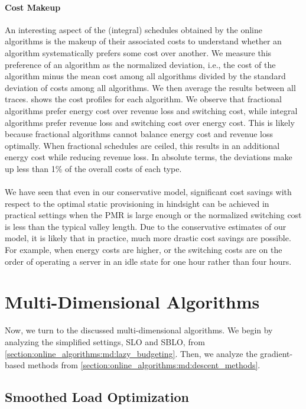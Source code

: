 \paragraph{Cost Makeup} An interesting aspect of the (integral) schedules obtained by the online algorithms is the makeup of their associated costs to understand whether an algorithm systematically prefers some cost over another. We measure this preference of an algorithm as the normalized deviation, i.e., the cost of the algorithm minus the mean cost among all algorithms divided by the standard deviation of costs among all algorithms. We then average the results between all traces.  shows the cost profiles for each algorithm. We observe that fractional algorithms prefer energy cost over revenue loss and switching cost, while integral algorithms prefer revenue loss and switching cost over energy cost. This is likely because fractional algorithms cannot balance energy cost and revenue loss optimally. When fractional schedules are ceiled, this results in an additional energy cost while reducing revenue loss. In absolute terms, the deviations make up less than 1\% of the overall costs of each type.

\paragraph{} We have seen that even in our conservative model, significant cost savings with respect to the optimal static provisioning in hindsight can be achieved in practical settings when the PMR is large enough or the normalized switching cost is less than the typical valley length. Due to the conservative estimates of our model, it is likely that in practice, much more drastic cost savings are possible. For example, when energy costs are higher, or the switching costs are on the order of operating a server in an idle state for one hour rather than four hours.

\section{Multi-Dimensional Algorithms}

Now, we turn to the discussed multi-dimensional algorithms. We begin by analyzing the simplified settings, SLO and SBLO, from \cref{section:online_algorithms:md:lazy_budgeting}. Then, we analyze the gradient-based methods from \cref{section:online_algorithms:md:descent_methods}.

\subsection{Smoothed Load Optimization}

